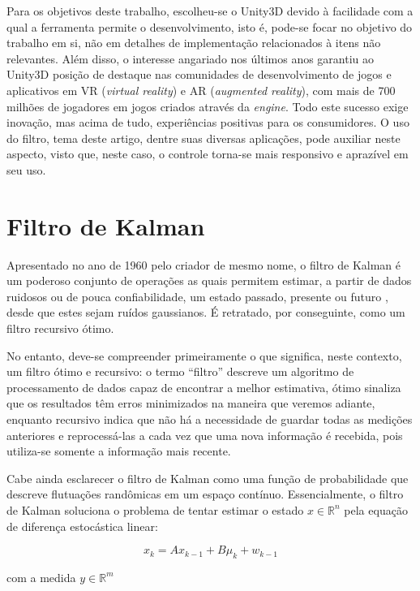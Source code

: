 \documentclass[conference]{IEEEtran}
\begin{document}
Para os objetivos deste trabalho, escolheu-se o Unity3D devido à facilidade com a qual a ferramenta permite o desenvolvimento, isto é, pode-se focar no objetivo do trabalho em si, não em detalhes de implementação relacionados à itens não relevantes. Além disso, o interesse angariado nos últimos anos garantiu ao Unity3D posição de destaque nas comunidades de desenvolvimento de jogos e aplicativos em VR (\textit{virtual reality}) e AR (\textit{augmented reality}), com mais de 700 milhões de jogadores em jogos criados através da \textit{engine}. Todo este sucesso exige inovação, mas acima de tudo, experiências positivas para os consumidores. O uso do filtro, tema deste artigo, dentre suas diversas aplicações, pode auxiliar neste aspecto, visto que, neste caso, o controle torna-se mais responsivo e aprazível em seu uso. 

\section{Filtro de Kalman} \label{sec:kalmanfilter}
Apresentado no ano de 1960 pelo criador de mesmo nome, o filtro de Kalman é um poderoso conjunto de operações as quais permitem estimar, a partir de dados ruidosos ou de pouca confiabilidade, um estado passado, presente ou futuro \cite{WelchBishop}, desde que estes sejam ruídos gaussianos. É retratado, por conseguinte, como um filtro recursivo ótimo.

No entanto, deve-se compreender primeiramente o que significa, neste contexto, um filtro ótimo e recursivo: o termo \enquote{filtro} descreve um algoritmo de processamento de dados capaz de encontrar a melhor estimativa, ótimo sinaliza que os resultados têm erros minimizados na maneira que veremos adiante, enquanto recursivo indica que não há a necessidade de guardar todas as medições anteriores e reprocessá-las a cada vez que uma nova informação é recebida, pois utiliza-se somente a informação mais recente.

Cabe ainda esclarecer o filtro de Kalman como uma função de probabilidade que descreve flutuações randômicas em um espaço contínuo. Essencialmente, o filtro de Kalman soluciona o problema de tentar estimar o estado $  x \in \mathbb{R}^{n}$ pela equação de diferença estocástica linear:

\begin{equation}
x_k = Ax_{k-1} + B\mu_k + w_{k-1}
\end{equation}

com a medida $ y \in \mathbb{R}^{m}$
\end{document}
